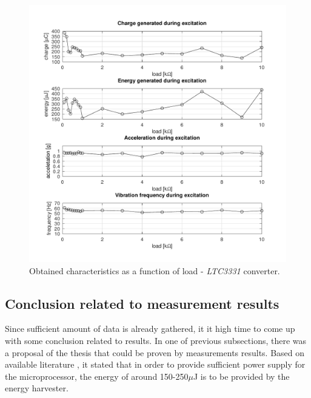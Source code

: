 \documentclass[12pt,a4paper]{article}
\begin{document}
\begin{figure}[ht!]
\includegraphics[scale=0.85]{results3331.pdf}
\caption{Obtained characteristics as a function of load - \textit{LTC3331} converter.}
\label{fig:results3331}
\end{figure}
\par

\subsection{Conclusion related to measurement results}
Since sufficient amount of data is already gathered, it it high time to come up with some conclusion related to results. In one of previous subsections, there was a proposal of the thesis that could be proven by measurements results. Based on available literature \cite{joules}, it stated that in order to provide sufficient power supply for the microprocessor, the energy of around 150-250$\mu$J is to be provided by the energy harvester.
\end{document}
